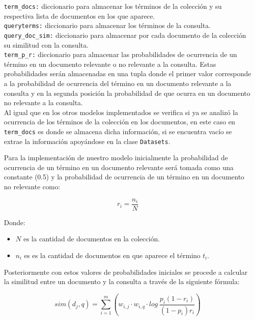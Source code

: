 \documentclass[spanish]{article}
\begin{document}
			\texttt{term\_docs:} diccionario para almacenar los términos de la colección y su respectiva lista de documentos en los que aparece.\\

			\texttt{queryterms:} diccionario para almacenar los términos de la consulta.\\

			\texttt{query\_doc\_sim:} diccionario para almacenar por cada documento de la colección su similitud con la consulta.\\

			\texttt{term\_p\_r:} diccionario para almacenar las probabilidades de ocurrencia de un término en un documento relevante o no relevante a la consulta. Estas probabilidades serán almacenadas en una tupla donde el primer valor corresponde a la probabilidad de ocurrencia del término en un documento relevante a la consulta y en la segunda posición la probabilidad de que ocurra en un documento no relevante a la consulta.\\

			Al igual que en los otros modelos implementados se verifica si ya se analizó la ocurrencia de los términos de la colección en los documentos, en este caso en \texttt{term\_docs} es donde se almacena dicha información, si se encuentra vacío se extrae la información apoyándose en la clase \texttt{Datasets}.

			Para la implementación de nuestro modelo inicialmente la probabilidad de ocurrencia de un término en un documento relevante será tomada como una constante (0.5) y la probabilidad de ocurrencia de un término en un documento no relevante como:

			\begin{equation}\label{key}
				\displaystyle r_i = \frac{n_i}{N}
			\end{equation}

			Donde: 
			\begin{itemize}
				\item $ N $ es la cantidad de documentos en la colección.

				\item $ n_i $ es es la cantidad de documentos en que aparece el término $ t_i $.
			\end{itemize}

			Posteriormente con estos valores de probabilidades iniciales se procede a calcular la similitud entre un documento y la consulta a través de la siguiente fórmula:
	
			\begin{equation}
				\displaystyle sim(d_j,q) = \sum_{i=1}^m \left( w_{i,j} \cdot w_{i,q} \cdot log \ \frac{p_i (1 - r_i)}{(1- p_i ) r_i} \right)
			\end{equation}
\end{document}
